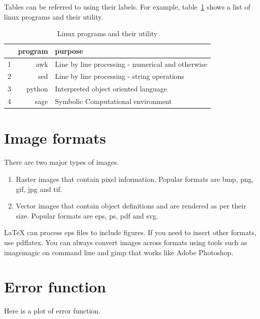 \documentclass[12pt,a4paper]{article}
\begin{document}
Tables can be referred to using their labels. For example, table~\ref{tab:progs} shows a list of linux programs and their utility.


\begin{table}
	\begin{center}
\begin{tabular}{|c|r|l|}
\hline
	& program & purpose \\
\hline
	1 & awk & Line by line processing - numerical and otherwise \\
	2 & sed & Line by line processing - string operations \\
	3 & python & Interpreted object oriented language \\
	4 & sage & Symbolic Computational environment \\
\hline
\end{tabular}
	\caption{Linux programs and their utility}
	\label{tab:progs}
	\end{center}
\end{table}


\section{Image formats}

There are two major types of images.

\begin{enumerate}
	\item Raster images that contain pixel information. Popular formats are bmp, png, gif, jpg and tif.
	\item Vector images that contain object definitions and are rendered as per their size. Popular formats are eps, ps, pdf and svg.
\end{enumerate}

LaTeX can process eps files to include figures. If you need to insert other formats, use pdflatex. You can always convert images across formats using tools such as imagemagic on command line and gimp that works like Adobe Photoshop.

\section{Error function}

Here is a plot of error function.
 
\end{document}
